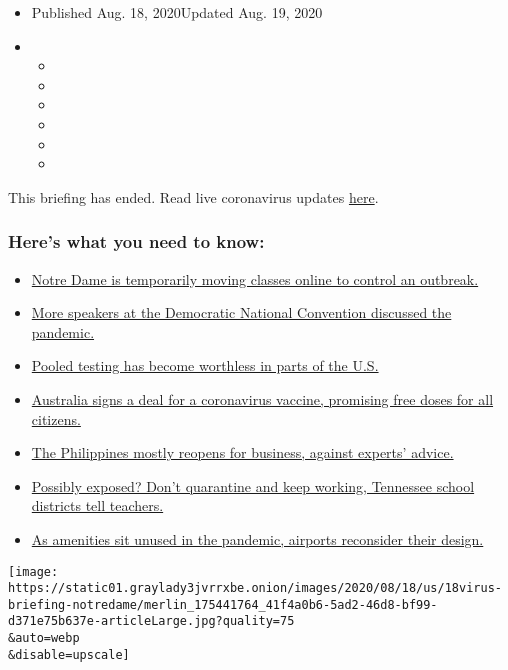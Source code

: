 \begin{itemize}
\item
  Published Aug. 18, 2020Updated Aug. 19, 2020
\item
  \begin{itemize}
  \item
  \item
  \item
  \item
  \item
  \item
  \end{itemize}
\end{itemize}

This briefing has ended. Read live coronavirus updates
\href{https://www.nytimes3xbfgragh.onion/2020/08/19/world/covid-19-coronavirus.html}{here}.

\hypertarget{heres-what-you-need-to-know}{%
\subsubsection{Here's what you need to
know:}\label{heres-what-you-need-to-know}}

\begin{itemize}
\tightlist
\item
  \protect\hyperlink{link-7aac91ac}{Notre Dame is temporarily moving
  classes online to control an outbreak.}
\item
  \protect\hyperlink{link-610f55db}{More speakers at the Democratic
  National Convention discussed the pandemic.}
\item
  \protect\hyperlink{link-3b63ae88}{Pooled testing has become worthless
  in parts of the U.S.}
\item
  \protect\hyperlink{link-6fec5437}{Australia signs a deal for a
  coronavirus vaccine, promising free doses for all citizens.}
\item
  \protect\hyperlink{link-5f504ac7}{The Philippines mostly reopens for
  business, against experts' advice.}
\item
  \protect\hyperlink{link-4b1c53e}{Possibly exposed? Don't quarantine
  and keep working, Tennessee school districts tell teachers.}
\item
  \protect\hyperlink{link-15d34ee1}{As amenities sit unused in the
  pandemic, airports reconsider their design.}
\end{itemize}

\texttt{[image: https://static01.graylady3jvrrxbe.onion/images/2020/08/18/us/18virus-briefing-notredame/merlin\_175441764\_41f4a0b6-5ad2-46d8-bf99-d371e75b637e-articleLarge.jpg?quality=75\\\&auto=webp\\\&disable=upscale]}

